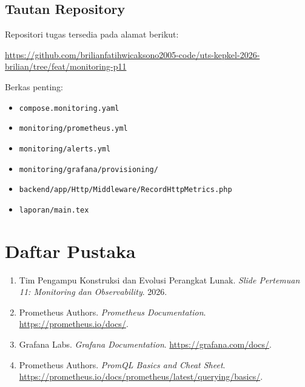\documentclass[a4paper,oneside,11pt]{book}
\begin{document}
\section{Tautan Repository}
Repositori tugas tersedia pada alamat berikut:

\begin{center}
\url{https://github.com/brilianfatihwicaksono2005-code/uts-kepkel-2026-brilian/tree/feat/monitoring-p11}
\end{center}

Berkas penting:
\begin{itemize}[leftmargin=*]
    \item \texttt{compose.monitoring.yaml}
    \item \texttt{monitoring/prometheus.yml}
    \item \texttt{monitoring/alerts.yml}
    \item \texttt{monitoring/grafana/provisioning/}
    \item \texttt{backend/app/Http/Middleware/RecordHttpMetrics.php}
    \item \texttt{laporan/main.tex}
\end{itemize}

\chapter{Daftar Pustaka}
\begin{enumerate}[leftmargin=*]
    \item Tim Pengampu Konstruksi dan Evolusi Perangkat Lunak. \emph{Slide Pertemuan 11: Monitoring dan Observability}. 2026.
    \item Prometheus Authors. \emph{Prometheus Documentation}. \url{https://prometheus.io/docs/}.
    \item Grafana Labs. \emph{Grafana Documentation}. \url{https://grafana.com/docs/}.
    \item Prometheus Authors. \emph{PromQL Basics and Cheat Sheet}. \url{https://prometheus.io/docs/prometheus/latest/querying/basics/}.
\end{enumerate}
\end{document}

